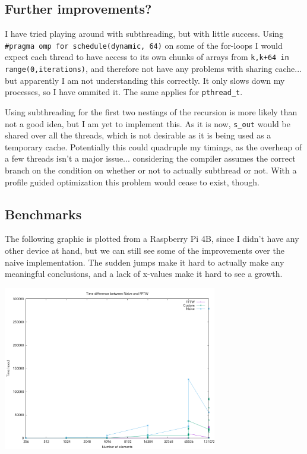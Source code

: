 \documentclass{../../../myassignment}
\begin{document}
	\subsection*{Further improvements?}
	I have tried playing around with subthreading, but with little success. Using \texttt{\#pragma omp for schedule(dynamic, 64)} on some of the for-loops I would expect each thread to have access to its own chunks of arrays from \texttt{k,k+64 in range(0,iterations)}, and therefore not have any problems with sharing cache... but apparently I am not understanding this correctly. It only slows down my processes, so I have ommited it. The same applies for \texttt{pthread\_t}.

	Using subthreading for the first two nestings of the recursion is more likely than not a good idea, but I am yet to implement this. As it is now, \texttt{s\_out} would be shared over all the threads, which is not desirable as it is being used as a temporary cache. Potentially this could quadruple my timings, as the overheap of a few threads isn't a major issue... considering the compiler assumes the correct branch on the condition on whether or not to actually subthread or not. With a profile guided optimization this problem would cease to exist, though.

	\pagebreak
	\subsection*{Benchmarks}
	The following graphic is plotted from a Raspberry Pi 4B, since I didn't have any other device at hand, but we can still see some of the improvements over the naive implementation. The sudden jumps make it hard to actually make any meaningful conclusions, and a lack of x-values make it hard to see a growth.

	\includegraphics[width=0.7\textwidth]{img/diffs.png}
\end{document}
